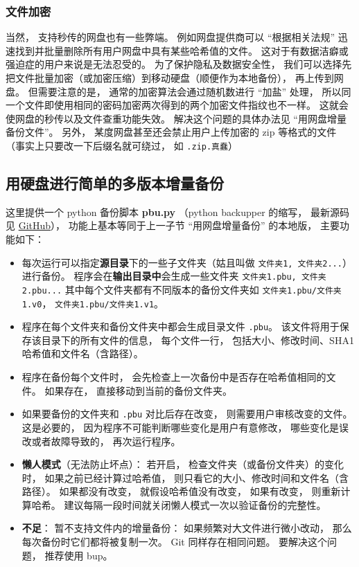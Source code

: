 \subsubsection{文件加密}
当然， 支持秒传的网盘也有一些弊端。 例如网盘提供商可以 “根据相关法规” 迅速找到并批量删除所有用户网盘中具有某些哈希值的文件。 这对于有数据洁癖或强迫症的用户来说是无法忍受的。 为了保护隐私及数据安全性， 我们可以选择先把文件批量加密（或加密压缩）到移动硬盘（顺便作为本地备份）， 再上传到网盘。 但需要注意的是， 通常的加密算法会通过随机数进行 “加盐” 处理， 所以同一个文件即使用相同的密码加密两次得到的两个加密文件指纹也不一样。 这就会使网盘的秒传以及文件查重功能失效。 解决这个问题的具体办法见 “用网盘增量备份文件”。 另外， 某度网盘甚至还会禁止用户上传加密的 zip 等格式的文件（事实上只要改一下后缀名就可绕过， 如 \verb|.zip.真蠢|）

\subsection{用硬盘进行简单的多版本增量备份}
这里提供一个 python 备份脚本 \textbf{pbu.py} （python backupper 的缩写， 最新源码见 \href{https://github.com/MacroUniverse/pbu}{GitHub}）， 功能上基本等同于上一子节 “用网盘增量备份” 的本地版， 主要功能如下：
\begin{itemize}
\item 每次运行可以指定\textbf{源目录}下的一些子文件夹（姑且叫做 \verb|文件夹1, 文件夹2...|）进行备份。 程序会在\textbf{输出目录中}会生成一些文件夹 \verb|文件夹1.pbu, 文件夹2.pbu...| 其中每个文件夹都有不同版本的备份文件夹如 \verb|文件夹1.pbu/文件夹1.v0|， \verb|文件夹1.pbu/文件夹1.v1|。
\item 程序在每个文件夹和备份文件夹中都会生成目录文件 \verb|.pbu|。 该文件将用于保存该目录下的所有文件的信息， 每个文件一行， 包括大小、修改时间、SHA1 哈希值和文件名（含路径）。
\item 程序在备份每个文件时， 会先检查上一次备份中是否存在哈希值相同的文件。 如果存在， 直接移动到当前的备份文件夹。
\item 如果要备份的文件夹和 \verb|.pbu| 对比后存在改变， 则需要用户审核改变的文件。 这是必要的， 因为程序不可能判断哪些变化是用户有意修改， 哪些变化是误改或者故障导致的， 再次运行程序。
\item \textbf{懒人模式}（无法防止坏点）： 若开启， 检查文件夹（或备份文件夹）的变化时， 如果之前已经计算过哈希值， 则只看它的大小、修改时间和文件名（含路径）。 如果都没有改变， 就假设哈希值没有改变， 如果有改变， 则重新计算哈希。 建议每隔一段时间就关闭懒人模式一次以验证备份的完整性。
\item \textbf{不足}： 暂不支持文件内的增量备份： 如果频繁对大文件进行微小改动， 那么每次备份时它们都将被复制一次。 Git 同样存在相同问题。 要解决这个问题， 推荐使用 bup。
\end{itemize}
